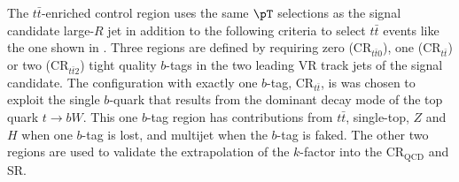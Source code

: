 The $t\bar{t}$-enriched control region uses the same $\pT$ selections as the
signal candidate large-$R$ jet in addition to the following criteria to select
$t\bar{t}$ events like the one shown in .
Three regions are defined by requiring zero ($\text{CR}_{t\bar{t}0}$), one
($\text{CR}_{t\bar{t}}$) or two ($\text{CR}_{t\bar{t}2}$) tight quality
$b$-tags in the two leading VR track jets of the signal candidate. The
configuration with exactly one $b$-tag, $\text{CR}_{t\bar{t}}$, is was chosen
to exploit the single $b$-quark that results from the dominant decay mode of
the top quark $t \rightarrow bW$.  This one $b$-tag region has contributions from
$t\bar{t}$, single-top, $Z$ and $H$ when one $b$-tag is lost, and multijet when
the $b$-tag is faked.  The other two regions are used to validate the
extrapolation of the $k$-factor into the $\text{CR}_{\text{QCD}}$ and SR.

